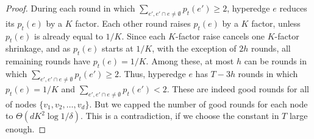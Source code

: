 \documentclass[11pt]{article}
\begin{document}
\begin{proof}
During each round in which $\sum_{e', e'\cap e\neq\emptyset} p_{t}(e') \geq 2$, hyperedge $e$ reduces its $p_{t}(e)$ by a $K$ factor. Each other round raises $p_{t}(e)$ by a $K$ factor, unless $p_{t}(e)$ is already equal to $1/K$. Since each $K$-factor raise cancels one $K$-factor shrinkage, and as $p_{t}(e)$ starts at $1/K$, with the exception of $2h$ rounds, all remaining rounds have $p_{t}(e)=1/K$. Among these, at most $h$ can be rounds in which $\sum_{e', e'\cap e\neq\emptyset} p_{t}(e') \geq 2$. Thus, hyperedge $e$ has $T-3h$ rounds in which $p_{t}(e)=1/K$ and $\sum_{e', e'\cap e\neq\emptyset} p_{t}(e') < 2$. These are indeed good rounds for all of nodes $\{v_1, v_2, \dots, v_d\}$. But we capped the number of good rounds for each node to $\Theta(dK^2 \log 1/\delta)$. This is a contradiction, if we choose the constant in $T$ large enough.
\end{proof}
\end{document}
